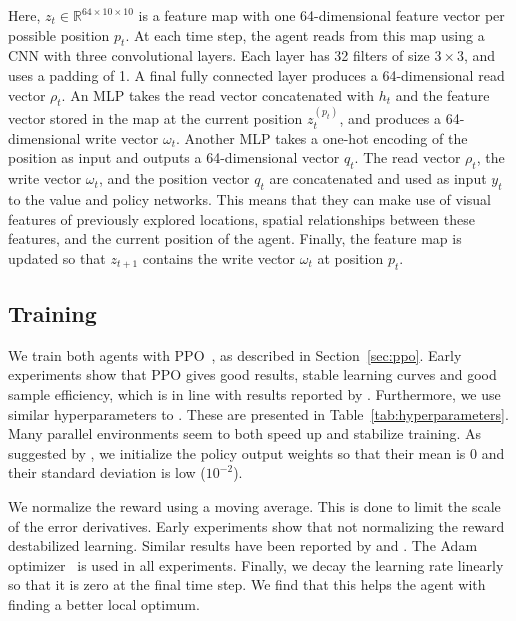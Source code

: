 Here, \(z_t \in \mathbb{R}^{64 \times 10 \times 10}\) is a feature map with one 64-dimensional feature vector per possible position \(p_t\).
At each time step, the agent reads from this map using a CNN with three convolutional layers.
Each layer has 32 filters of size \(3 \times 3\), and uses a padding of 1.
A final fully connected layer produces a 64-dimensional read vector \(\rho_t\).
An MLP takes the read vector concatenated with \(h_t\) and the feature vector stored in the map at the current position \(z_t^{(p_t)}\), and produces a 64-dimensional write vector \(\omega_{t}\).
Another MLP takes a one-hot encoding of the position as input and outputs a 64-dimensional vector \(q_t\).
The read vector \(\rho_t\), the write vector \(\omega_{t}\), and the position vector \(q_t\) are concatenated and used as input \(y_t\) to the value and policy networks.
This means that they can make use of visual features of previously explored locations, spatial relationships between these features, and the current position of the agent.
Finally, the feature map is updated so that \(z_{t+1}\) contains the write vector \(\omega_{t}\) at position \(p_t\).


\subsection{Training}

We train both agents with PPO~\cite{schulman_ppo_2017}, as described in Section~\ref{sec:ppo}.
Early experiments show that PPO gives good results, stable learning curves and good sample efficiency, which is in line with results reported by \cite{andrychowicz_empirical_2020}.
Furthermore, we use similar hyperparameters to \cite{cobbe_procgen_2020}.
These are presented in Table~\ref{tab:hyperparameters}.
Many parallel environments seem to both speed up and stabilize training. 
As suggested by \cite{andrychowicz_empirical_2020}, we initialize the policy output weights so that their mean is 0 and their standard deviation is low (\(10^{-2}\)).

We normalize the reward using a moving average.
This is done to limit the scale of the error derivatives.
Early experiments show that not normalizing the reward destabilized learning. %
Similar results have been reported by \cite{andrychowicz_empirical_2020} and \cite{mnih_atari_2013}.
The Adam optimizer~\cite{kingma_ba_2017} is used in all experiments.
Finally, we decay the learning rate linearly so that it is zero at the final time step.
We find that this helps the agent with finding a better local optimum.

